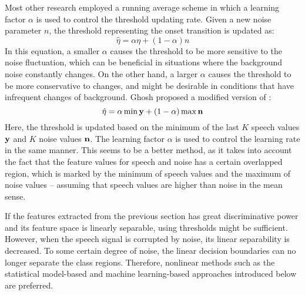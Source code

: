 Most other research employed a running average scheme in which a learning factor $\alpha$ is used to control the threshold updating rate. Given a new noise parameter $n$, the threshold representing the onset transition is updated as:
\begin{equation}\label{eq:adaptive_threshold}
	\hat{\eta} = \alpha\eta + (1-\alpha)n
\end{equation}
In this equation, a smaller $\alpha$ causes the threshold to be more sensitive to the noise fluctuation, which can be beneficial in situations where the background noise constantly changes. On the other hand, a larger $\alpha$ causes the threshold to be more conservative to changes, and might be desirable in conditions that have infrequent changes of background. Ghosh \etal \cite{ghosh2011robust} proposed a modified version of :
\begin{equation}\label{eq:adaptive_threshold_ghosh}
	\hat{\eta} = \alpha\min{\mathbf{y}} + (1-\alpha)\max{\mathbf{n}}
\end{equation}
Here, the threshold is updated based on the minimum of the last $K$ speech values $\mathbf{y}$ and $K$ noise values $\mathbf{n}$. The learning factor $\alpha$ is used to control the learning rate in the same manner. This seems to be a better method, as it takes into account the fact that the feature values for speech and noise has a certain overlapped region, which is marked by the minimum of speech values and the maximum of noise values -- assuming that speech values are higher than noise in the mean sense.

If the features extracted from the previous section has great discriminative power and its feature space is linearly separable, using thresholds might be sufficient. However, when the speech signal is corrupted by noise, its linear separability is decreased. To some certain degree of noise, the linear decision boundaries can no longer separate the class regions. Therefore, nonlinear methods such as the statistical model-based and machine learning-based approaches introduced below are preferred.

